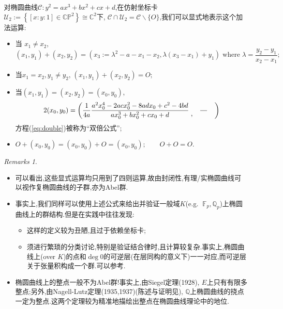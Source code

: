 \documentclass[12pt,A4paper,oneside,reqno]{amsart}
\numberwithin{equation}{section}
\theoremstyle{definition}
\theoremstyle{plain}
\theoremstyle{plain}
\numberwithin{equation}{section}
\theoremstyle{remark}
\newtheorem{remarks}[theorem]{Remarks}
\begin{document}
对椭圆曲线$\mathcal{C}:y^2=ax^3+bx^2+cx+d$,在仿射坐标卡$\mathcal{U}_2:=\left\{[x:y:1] \in \mathbb{CP}^2\right\} \cong \mathbb{C}^2$下, $\mathcal{C} \cap \mathcal{U}_2=\mathcal{C} \smallsetminus \{O\}$,我们可以显式地表示这个加法运算:
\begin{itemize}
	\item 当 $x_1 \neq x_2$, $$(x_1,y_1)+(x_2,y_2)=\left(x_3:=\lambda^2-a-x_1-x_2, \lambda (x_3-x_1)+y_1 \right) \text{ where } \lambda=\frac{y_2-y_1}{x_2-x_1};$$
	\item  当$x_1 = x_2, y_1 \neq y_2$, $(x_1,y_1)+(x_2,y_2)=O$;
	\item 当$(x_1,y_1)=(x_2,y_2)=(x_0,y_0)$,
	\begin{equation}\label{eq:double}
		2(x_0,y_0)=\left(\frac{1}{4a}\frac{a^2x_0^4-2acx_0^2-8adx_0+c^2-4bd}{ax_0^3+bx_0^2+cx_0+d} \;\raisebox{-5pt}{,}\quad\frac{\phantom{66}}{\phantom{66}}\quad\right)
	\end{equation}
	方程(\ref{eq:double})被称为“双倍公式”;
	\item $O+(x_0,y_0)=(x_0,y_0)+O=(x_0,y_0); \qquad O+O=O$.
\end{itemize}
\begin{remarks}\
	\begin{itemize}
		\item 可以看出,这些显式运算均只用到了四则运算,故由封闭性,有理/实椭圆曲线可以视作复椭圆曲线的子群,亦为Abel群.
		\item 事实上,我们同样可以使用上述公式来给出并验证一般域$K$(e.g. $\;\mathbb{F}_p,\mathbb{Q}_p$)上椭圆曲线上的群结构.但是在实践中往往发现:
		\begin{itemize}
			\item 这样的定义较为丑陋,且过于依赖坐标卡;
			\item 须进行繁琐的分类讨论,特别是验证结合律时,且计算较复杂.事实上,椭圆曲线上(over $K$)的点和$\deg 0$的可逆层(在层同构的意义下)一一对应,而可逆层关于张量积构成一个群.可以参考\cite[Proposition 19.9.3]{vakil2017rising}.
		\end{itemize}
		\item 椭圆曲线上的整点一般不为Abel群!事实上,由Siegel定理(1928), $E$上只有有限多整点;另外,由Nagell-Lutz定理(1935,1937)(陈述与证明见\cite[p56, Theorem 2.5]{silverman1992rational}), $\mathbb{Q}$上椭圆曲线的挠点一定为整点.这两个定理较为精准地描绘出整点在椭圆曲线理论中的地位.
	\end{itemize}
\end{remarks}
\end{document}
